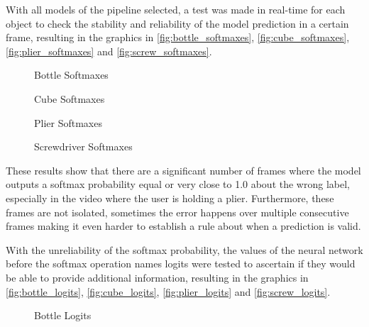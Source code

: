With all models of the pipeline selected, a test was made in real-time for each object to check the stability and reliability of the model prediction in a certain frame, resulting in the graphics in \autoref{fig:bottle_softmaxes}, \autoref{fig:cube_softmaxes}, \autoref{fig:plier_softmaxes} and \autoref{fig:screw_softmaxes}.

\begin{figure}[H]
    \centering
    {\fontsize{9}{11}\selectfont}
    \caption{Bottle Softmaxes}
    \label{fig:bottle_softmaxes}
\end{figure}

\begin{figure}[H]
    \centering
    {\fontsize{9}{11}\selectfont}
    \caption{Cube Softmaxes}
    \label{fig:cube_softmaxes}
\end{figure}

\begin{figure}[H]
    \centering
    {\fontsize{9}{11}\selectfont}
    \caption{Plier Softmaxes}
    \label{fig:plier_softmaxes}
\end{figure}

\begin{figure}[H]
    \centering
    {\fontsize{9}{11}\selectfont}
    \caption{Screwdriver Softmaxes}
    \label{fig:screw_softmaxes}
\end{figure}

These results show that there are a significant number of frames where the model outputs a softmax probability equal or very close to \num{1.0} about the wrong label, especially in the video where the user is holding a plier. Furthermore, these frames are not isolated, sometimes the error happens over multiple consecutive frames making it even harder to establish a rule about when a prediction is valid.

With the unreliability of the softmax probability, the values of the neural network before the softmax operation names logits were tested to ascertain if they would be able to provide additional information, resulting in the graphics in \autoref{fig:bottle_logits}, \autoref{fig:cube_logits}, \autoref{fig:plier_logits} and \autoref{fig:screw_logits}.

\begin{figure}[H]
    \centering
    {\fontsize{9}{11}\selectfont}
    \caption{Bottle Logits}
    \label{fig:bottle_logits}
\end{figure}

